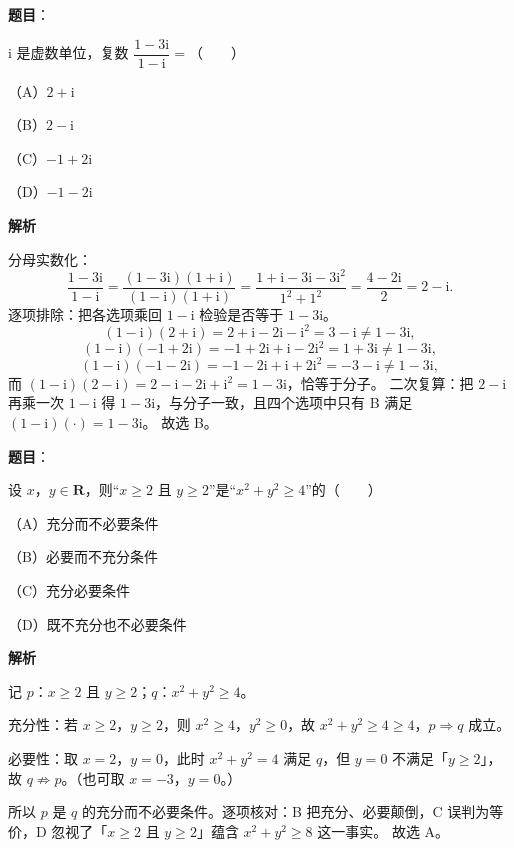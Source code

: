 \begin{answer}

\textbf{题目}：

$\mathrm{i}$ 是虚数单位，复数 $\dfrac{1-3\mathrm{i}}{1-\mathrm{i}}=$\mbox{（　　）}

（A）$2+\mathrm{i}$

（B）$2-\mathrm{i}$

（C）$-1+2\mathrm{i}$

（D）$-1-2\mathrm{i}$

\textbf{解析}

分母实数化：
\nopagebreak[4]
\[\frac{1-3\mathrm i}{1-\mathrm i}=\frac{(1-3\mathrm i)(1+\mathrm i)}{(1-\mathrm i)(1+\mathrm i)}=\frac{1+\mathrm i-3\mathrm i-3\mathrm i^2}{1^2+1^2}=\frac{4-2\mathrm i}{2}=2-\mathrm i.\]
逐项排除：把各选项乘回 $1-\mathrm i$ 检验是否等于 $1-3\mathrm i$。
\nopagebreak[4]
\[(1-\mathrm i)(2+\mathrm i)=2+\mathrm i-2\mathrm i-\mathrm i^2=3-\mathrm i\neq1-3\mathrm i,\]
\nopagebreak[4]
\[(1-\mathrm i)(-1+2\mathrm i)=-1+2\mathrm i+\mathrm i-2\mathrm i^2=1+3\mathrm i\neq1-3\mathrm i,\]
\nopagebreak[4]
\[(1-\mathrm i)(-1-2\mathrm i)=-1-2\mathrm i+\mathrm i+2\mathrm i^2=-3-\mathrm i\neq1-3\mathrm i,\]
而 $(1-\mathrm i)(2-\mathrm i)=2-\mathrm i-2\mathrm i+\mathrm i^2=1-3\mathrm i$，恰等于分子。
二次复算：把 $2-\mathrm i$ 再乘一次 $1-\mathrm i$ 得 $1-3\mathrm i$，与分子一致，且四个选项中只有 B 满足 $(1-\mathrm i)(\cdot)=1-3\mathrm i$。
故选 B。


\end{answer}
\begin{answer}

\textbf{题目}：

设 $x$，$y\in\mathbf{R}$，则“$x\geqslant2$ 且 $y\geqslant2$”是“$x^2+y^2\geqslant4$”的\mbox{（　　）}

（A）充分而不必要条件

（B）必要而不充分条件

（C）充分必要条件

（D）既不充分也不必要条件

\textbf{解析}

记 $p$：$x\geqslant2$ 且 $y\geqslant2$；$q$：$x^2+y^2\geqslant4$。

充分性：若 $x\geqslant2$，$y\geqslant2$，则 $x^2\geqslant4$，$y^2\geqslant0$，故 $x^2+y^2\geqslant4\geqslant4$，$p\Rightarrow q$ 成立。

必要性：取 $x=2$，$y=0$，此时 $x^2+y^2=4$ 满足 $q$，但 $y=0$ 不满足「$y\geqslant2$」，故 $q\not\Rightarrow p$。（也可取 $x=-3$，$y=0$。）

所以 $p$ 是 $q$ 的充分而不必要条件。逐项核对：B 把充分、必要颠倒，C 误判为等价，D 忽视了「$x\geqslant2$ 且 $y\geqslant2$」蕴含 $x^2+y^2\geqslant8$ 这一事实。
故选 A。


\end{answer}
